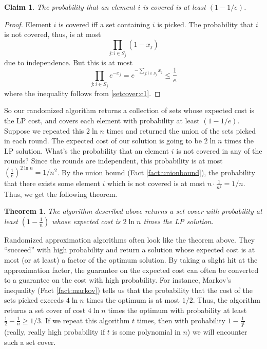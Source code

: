 \documentclass[11pt]{article}
\newtheorem{theorem}{Theorem}
\newtheorem{claim}{Claim}
\begin{document}
\begin{claim}
The probability that an element $i$ is covered is at least $(1-1/e)$.
\end{claim}
\begin{proof}
Element $i$ is covered iff a set containing $i$ is picked. The probability that $i$ is not covered, thus, is at most
$$\prod_{j:i\in S_j} (1 - x_j)$$ due to independence. But this is at most $$\prod_{j:i\in S_j} e^{-x_j} = e^{- \sum_{j:i\in S_j} x_j} \le \frac{1}{e}$$
where the inequality follows from \eqref{setcover:c1}.
\end{proof}

So our randomized algorithm returns a collection of sets whose expected cost is the LP cost, and covers each element with probability at least $(1-1/e)$. Suppose we repeated this $2\ln n$ times and returned the union of the sets picked in each round. The expected cost of our solution is going to be $2\ln n$ times the LP solution.
What's the probability that an element $i$ is not covered in any of the rounds? Since the rounds are independent, this probability is at most $(\frac{1}{e})^{2\ln n} = 1/n^2$. By the union bound (Fact \ref{fact:unionbound}), the probability that there exists some element $i$ which is not covered is at most $n\cdot\frac{1}{n^2} = 1/n$. Thus, we get the following theorem.

\begin{theorem}
The algorithm described above returns a set cover with probability at least $(1 - \frac{1}{n})$ whose expected cost is $2\ln n$ times the LP solution.
\end{theorem}

Randomized approximation algorithms often look like the theorem above. They ``succeed'' with high probability and return a solution whose expected cost is at most (or at least) a factor of the optimum solution. 
By taking a slight hit at the approximation factor, the guarantee on the expected cost can often be converted to a guarantee on the cost with high probability.  For instance, Markov's inequality (Fact \ref{fact:markov}) 
tells us that the probability that the cost of the sets picked exceeds $4\ln n$ times the optimum is at most $1/2$. Thus, the algorithm returns a set cover of cost $4\ln n$ times the optimum with probability at least $\frac{1}{2} - \frac{1}{n} \ge 1/3$. If we repeat this algorithm $t$ times, then with probability $1 - \frac{1}{3^t}$ (really, really high probability if $t$ is some polynomial in $n$) we will encounter such a set cover. \\
\end{document}
